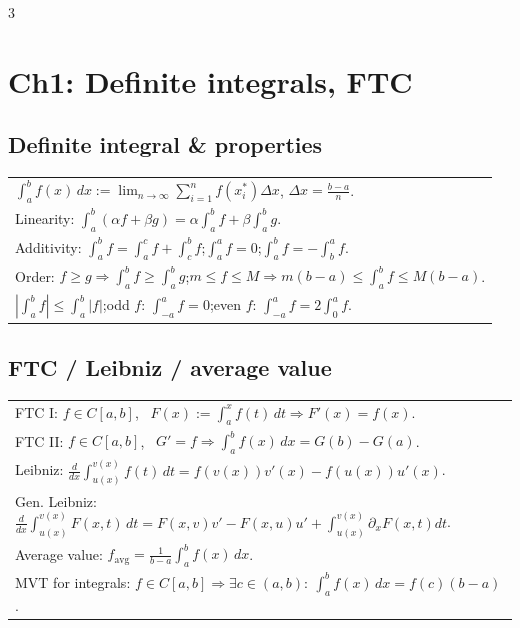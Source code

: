 \documentclass[10pt]{article}
\newcommand{\dx}{\,dx}
\begin{document}
\begin{multicols}{3}
\scriptsize
\raggedcolumns

\section*{Ch1: Definite integrals, FTC}
\subsection*{Definite integral \& properties}
\begin{tabular}{@{}p{}@{}}
$\displaystyle \int_a^b f(x)\dx:=\lim_{n\to\infty}\sum_{i=1}^n f(x_i^*)\Delta x$, $\Delta x=\frac{b-a}{n}$.\\
Linearity: $\int_a^b(\alpha f+\beta g)=\alpha\int_a^b f+\beta\int_a^b g$.\\
Additivity: $\int_a^b f=\int_a^c f+\int_c^b f$;\quad $\int_a^a f=0$;\quad $\int_a^b f=-\int_b^a f$.\\
Order: $f\ge g\Rightarrow \int_a^b f\ge \int_a^b g$;\quad $m\le f\le M\Rightarrow m(b-a)\le \int_a^b f\le M(b-a)$.\\
$\left|\int_a^b f\right|\le \int_a^b |f|$;\quad odd $f$: $\int_{-a}^a f=0$;\quad even $f$: $\int_{-a}^a f=2\int_0^a f$.\\
\end{tabular}

\subsection*{FTC / Leibniz / average value}
\begin{tabular}{@{}p{}@{}}
FTC I: $f\in C[a,b]$, \ $F(x):=\displaystyle\int_a^x f(t)\,dt \Rightarrow F'(x)=f(x)$.\\
FTC II: $f\in C[a,b]$, \ $G'=f \Rightarrow \displaystyle\int_a^b f(x)\dx=G(b)-G(a)$.\\
Leibniz: $\displaystyle \frac{d}{dx}\int_{u(x)}^{v(x)} f(t)\,dt
=f(v(x))v'(x)-f(u(x))u'(x)$.\\
Gen. Leibniz: $\! \frac{d}{dx}\!\int_{u(x)}^{v(x)}\!\!F(x,t)\!\,dt
\!=\!F(x,v)v'\!-\!F(x,u)u'\!+\!\int_{u(x)}^{v(x)}\!\partial_xF(x,t)dt$.\\
Average value: $\displaystyle f_{\text{avg}}=\frac{1}{b-a}\int_a^b f(x)\dx$.\\
MVT for integrals: $f\in C[a,b]\Rightarrow \exists c\in(a,b):\ 
\displaystyle \int_a^b f(x)\dx=f(c)(b-a)$.\\
\end{tabular}



\end{multicols}
\end{document}
